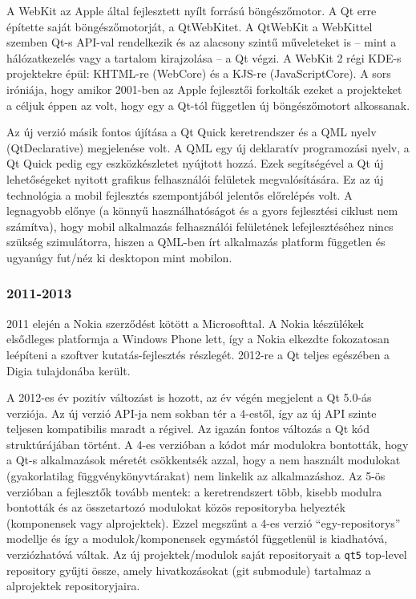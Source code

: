 \documentclass[12pt]{report}
\begin{document}
A WebKit az Apple által fejlesztett nyílt forrású böngészőmotor. A Qt erre építette saját
böngészőmotorját, a QtWebKitet. A QtWebKit a WebKittel szemben Qt-s API-val rendelkezik és az
alacsony szintű műveleteket is -- mint a hálózatkezelés vagy a tartalom kirajzolása -- a Qt
végzi. A WebKit 2 régi KDE-s projektekre épül: KHTML-re (WebCore) és a
KJS-re (JavaScriptCore). A sors iróniája, hogy amikor 2001-ben az Apple fejlesztői forkolták
ezeket a projekteket a céljuk éppen az volt, hogy egy a Qt-tól független új böngészőmotort
alkossanak.

Az új verzió másik fontos újítása a Qt Quick keretrendszer és a QML nyelv (QtDeclarative)
megjelenése volt. A QML egy új deklaratív programozási nyelv, a Qt Quick pedig egy
eszközkészletet nyújtott hozzá. Ezek segítségével a Qt új lehetőségeket nyitott grafikus
felhasználói felületek megvalósítására. Ez az új technológia a mobil fejlesztés szempontjából
jelentős előrelépés volt. A legnagyobb előnye (a könnyű használhatóságot és a gyors
fejlesztési ciklust nem számítva), hogy mobil alkalmazás felhasználói felületének
lefejlesztéséhez nincs szükség szimulátorra, hiszen a QML-ben írt alkalmazás
platform független és ugyanúgy fut/néz ki desktopon mint mobilon.

\subsubsection{2011-2013}
2011 elején a Nokia szerződést kötött a Microsofttal. A Nokia készülékek elsődleges
platformja a Windows Phone lett, így a Nokia elkezdte fokozatosan leépíteni a
szoftver kutatás-fejlesztés részlegét. 2012-re a Qt teljes egészében a Digia
tulajdonába került.

A 2012-es év pozitív változást is hozott, az év végén megjelent a Qt 5.0-ás verziója.
Az új verzió API-ja nem sokban tér a 4-estől, így az új API szinte teljesen kompatibilis
maradt a régivel. Az igazán fontos változás a Qt kód struktúrájában történt.
A 4-es verzióban a kódot már modulokra bontották, hogy a Qt-s alkalmazások méretét
csökkentsék azzal, hogy a nem használt modulokat (gyakorlatilag függvénykönyvtárakat) nem
linkelik az alkalmazáshoz.
Az 5-ös verzióban a fejlesztők tovább mentek: a keretrendszert több,
kisebb modulra bontották és az összetartozó modulokat közös repositoryba helyezték
(komponensek vagy alprojektek). Ezzel megszűnt a 4-es verzió ``egy-repositorys'' modellje
és így a modulok/komponensek egymástól függetlenül is kiadhatóvá, verziózhatóvá váltak.
Az új projektek/modulok saját repositoryait a \texttt{qt5} top-level repository gyűjti össze,
amely hivatkozásokat (git submodule) tartalmaz a alprojektek repositoryjaira.
\end{document}
